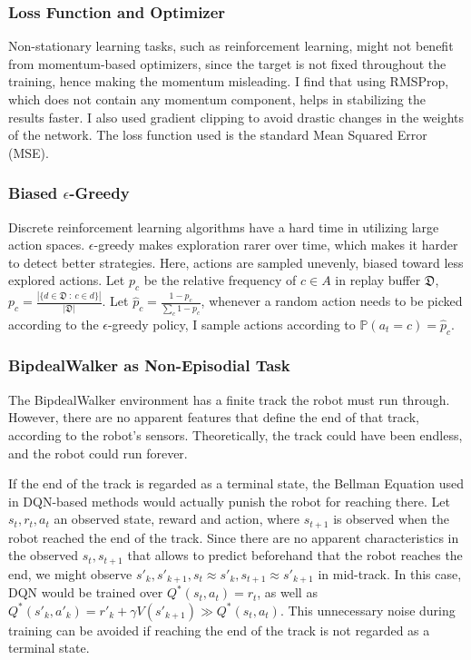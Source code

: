 \documentclass{article}
\begin{document}
\begin{multicols}{2}
\subsubsection{Loss Function and Optimizer}
Non-stationary learning tasks, such as reinforcement learning, might not benefit from momentum-based optimizers, since the target is not fixed throughout the training, hence making the momentum misleading. I find that using RMSProp, which does not contain any momentum component, helps in stabilizing the results faster. I also used gradient clipping to avoid drastic changes in the weights of the network. The loss function used is the standard Mean Squared Error (MSE).

\subsubsection{Biased $\epsilon$-Greedy}
Discrete reinforcement learning algorithms have a hard time in utilizing large action spaces. $\epsilon$-greedy makes exploration rarer over time, which makes it harder to detect better strategies. Here, actions are sampled unevenly, biased toward less explored actions. Let $p_c$ be the relative frequency of $c \in A$ in replay buffer $\mathfrak{D}$, $p_c = \frac{|\{d \in \mathfrak{D}\ :\ c \in d \}|}{|\mathfrak{D}|}$.
Let $\hat{p}_c = \frac{1 - p_c}{\sum_c 1 - p_c}$, whenever a random action needs to be picked according to the $\epsilon$-greedy policy, I sample actions according to $\mathbb{P}(a_t = c) = \hat{p}_c$.

\subsubsection{BipdealWalker as Non-Episodial Task}
The BipdealWalker environment has a finite track the robot must run through. However, there are no apparent features that define the end of that track, according to the robot's sensors. Theoretically, the track could have been endless, and the robot could run forever. 

If the end of the track is regarded as a terminal state, the Bellman Equation used in DQN-based methods would actually punish the robot for reaching there. 
Let $s_t, r_t, a_t$ an observed state, reward and action, where $s_{t+1}$ is observed when the robot reached the end of the track. Since there are no apparent characteristics in the observed $s_t, s_{t+1}$ that allows to predict beforehand that the robot reaches the end, we might observe $s'_k, s'_{k+1}, s_t \approx s'_k, s_{t+1} \approx s'_{k+1}$ in mid-track. In this case, DQN would be trained over $Q^*(s_t, a_t) = r_t$, as well as $Q^*(s'_k, a'_k) = r'_k + \gamma V(s'_{k+1}) \gg Q^*(s_t, a_t)$. This unnecessary noise during training can be avoided if reaching the end of the track is not regarded as a terminal state.


\end{multicols}
\end{document}
